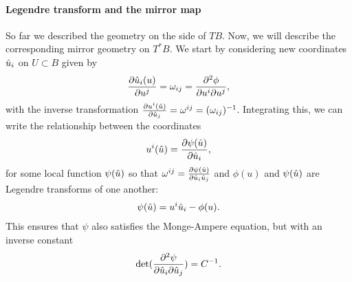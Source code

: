 \documentclass[letterpaper,12pt]{article}
\newcommand{\p}{\partial}
\theoremstyle{definition}
\theoremstyle{remark}
\theoremstyle{examples}
\begin{document}
\paragraph{Legendre transform and the mirror map}
So far we described the geometry on the side of $TB$. Now, we will describe the corresponding mirror geometry on $T^*B$. We start by considering new coordinates $\hat{u}_i$ on $U\subset B$ given by
\begin{align*}
\frac{\p\uh_i(u)}{\p u^j}=\omega_{ij}=  \frac{\p^2\phi}{\p u^i \p u^j},
\end{align*}
with the inverse transformation $\frac{\p u^i(\uh)}{\p \uh_j}=\omega^{ij}=(\omega_{ij})^{-1}$. Integrating this, we can write the relationship between the coordinates
\begin{align*}
    u^i(\uh)=\frac{\p \psi(\uh)}{\p \uh_i},
\end{align*}
for some local function $\psi(\hat{u})$ so that $\omega^{ij}=\frac{\p \psi(\uh)}{\p \uh_i\uh_j}$ and $\phi(u)$ and $\psi(\hat{u})$ are Legendre transforms of one another:
\begin{align*}
    \psi(\hat{u})=u^i \hat{u}_i-\phi(u).
\end{align*}
This ensures that $\psi$ also satisfies the Monge-Ampere equation, but with an inverse constant
\begin{align}\label{dual-monge-ampere}
    \text{det}(\frac{\p^2\psi}{\p \uh_i\p \uh_j})=C^{-1}.
\end{align}
\end{document}
